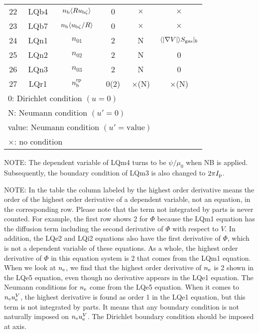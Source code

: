 \documentclass[11pt]{article}
\def\r#1{{\rm#1}}
\def\aves#1{\langle#1\rangle}
\def\nee{n_\r{e}}
\def\nb{n_\r{b}}
\def\nna{n_{01}}
\def\nnb{n_{02}}
\def\nnc{n_{03}}
\def\ubzt{u_{\r{b}\zeta}}
\def\ueV{u_\r{e}^V}
\def\nbrp{n_\r{b}^\r{rp}}
\begin{document}
\begin{tabular}{|c|c|c|c|c|c|}
 22   & LQb4 & $\nb\aves{R\ubzt}$   & 0    &  $\times$ & $\times$\\
 23   & LQb7 & $\nb\aves{\ubzt/R}$  & 0    &  $\times$ & $\times$\\
 24   & LQn1 & $\nna$               & 2    &  N        & $\aves{|\nabla V|}S_\r{gas}|_b$\\
 25   & LQn2 & $\nnb$               & 2    &  N        & 0\\
 26   & LQn3 & $\nnc$               & 2    &  N        & 0\\
 27   & LQr1 & $\nbrp$              & 0(2) &  $\times$(N) & $\times$(N)\\\hline
 \multicolumn{5}{l}{0: Dirichlet condition $(u=0)$}\\
 \multicolumn{5}{l}{N: Neumann condition $(u'=0)$}\\
 \multicolumn{5}{l}{value: Neumann condition $(u'=\mbox{value})$}\\
 \multicolumn{5}{l}{$\times$: no condition}
\end{tabular}
%

\medskip

NOTE: The dependent variable of LQm4 turns to be $\psi/\mu_0$ when NB is
applied. Subsequently, the boundary condition of LQm3 is also changed to
$2\pi I_\r{p}$.

NOTE: In the table the column labeled by the highest order derivative means
the order of the highest order derivative of a dependent variable, not
an equation, in the corresponding row.
Please note that the term not integrated by parts is never counted.
For example, the first row shows 2 for $\Phi$ because the LQm1 equation
has the diffusion term including the second derivative of $\Phi$ with
respect to $V$. In addition, the LQe2 and LQi2 equations also have the
first derivative of $\Phi$, which is not a dependent variable of these
equations. As a whole, the highest order derivative of $\Phi$ in this
equation system is 2 that comes from the LQm1 equation.
When we look at $\nee$, we find that the highest order derivative of
$\nee$ is 2 shown in the LQe5 equation, even though no derivative
appears in the LQe1 equation. The Neumann conditions for $\nee$ come
from the LQe5 equation.
When it comes to $\nee\ueV$, the highest derivative is found as order 1
in the LQe1 equation, but this term is not integrated by parts.
It means that any boundary condition is not naturally imposed on
$\nee\ueV$. The Dirichlet boundary condition should be imposed at axis.
\end{document}
